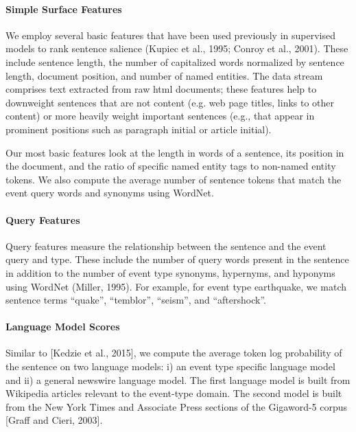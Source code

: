 \paragraph{Simple Surface Features} 

We employ several basic features
that have been used previously in supervised
models to rank sentence salience (Kupiec et al.,
1995; Conroy et al., 2001). These include sentence
length, the number of capitalized words normalized
by sentence length, document position,
and number of named entities. The data stream
comprises text extracted from raw html documents;
these features help to downweight sentences
that are not content (e.g. web page titles,
links to other content) or more heavily weight important
sentences (e.g., that appear in prominent
positions such as paragraph initial or article initial).


Our most basic features look at the length in
words of a sentence, its position in the document, and the ratio
of specific named entity tags to non-named entity tokens.
We also compute the average number of sentence tokens that
match the event query words and synonyms using WordNet.


\paragraph{Query Features} Query features measure the
relationship between the sentence and the event
query and type. These include the number of
query words present in the sentence in addition to
the number of event type synonyms, hypernyms,
and hyponyms using WordNet (Miller, 1995). For
example, for event type earthquake, we match sentence
terms “quake”, “temblor”, “seism”, and “aftershock”.


\paragraph{Language Model Scores}



Similar to [Kedzie et al.,
2015], we compute the average token log probability of the
sentence on two language models: i) an event type specific
language model and ii) a general newswire language model.
The first language model is built from Wikipedia articles relevant
to the event-type domain. The second model is built
from the New York Times and Associate Press sections of the
Gigaword-5 corpus [Graff and Cieri, 2003].




